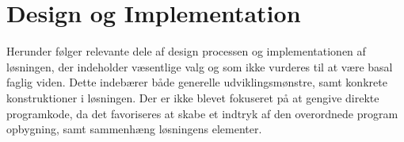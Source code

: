 \chapter{Design og Implementation}

Herunder følger relevante dele af design processen og implementationen af løsningen, der indeholder væsentlige valg og som ikke vurderes til at være basal faglig viden. Dette indebærer både generelle udviklingsmønstre, samt konkrete konstruktioner i løsningen. Der er ikke blevet fokuseret på at gengive direkte programkode, da det favoriseres at skabe et indtryk af den overordnede program opbygning, samt sammenhæng løsningens elementer.






